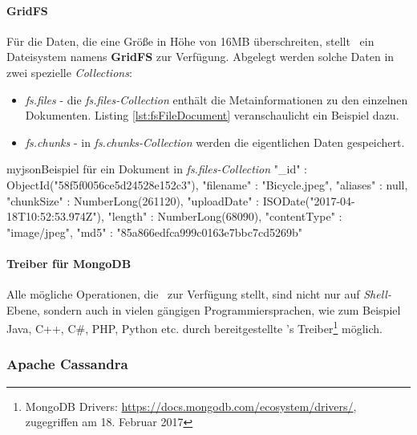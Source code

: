 \paragraph{GridFS}
Für die Daten, die eine Größe in Höhe von 16MB überschreiten, stellt \mongo\ ein Dateisystem namens \textbf{GridFS} zur Verfügung. Abgelegt werden solche Daten in zwei spezielle \textit{Collections}:

\begin{itemize}

\item \textit{fs.files} - die \textit{fs.files-Collection} enthält die Metainformationen zu den einzelnen Dokumenten. Listing \ref{lst:fsFileDocument} veranschaulicht ein Beispiel dazu.
\item \textit{fs.chunks} - in \textit{fs.chunks-Collection} werden die eigentlichen Daten gespeichert.

\end{itemize}

\begin{listingsboxJava}[label={lst:fsFileDocument}]{myjson}{Beispiel für ein Dokument in \textit{fs.files-Collection}}
{
	"_id" : ObjectId("58f5f0056ce5d24528e152c3"),
	"filename" : "Bicycle.jpeg",
	"aliases" : null,
	"chunkSize" : NumberLong(261120),
	"uploadDate" : ISODate("2017-04-18T10:52:53.974Z"),
	"length" : NumberLong(68090),
	"contentType" : "image/jpeg",
	"md5" : "85a866edfca999c0163e7bbc7cd5269b"
}
\end{listingsboxJava}

\paragraph{Treiber für MongoDB}
Alle mögliche Operationen, die \mongo\ zur Verfügung stellt, sind nicht nur auf \textit{Shell-}Ebene, sondern auch in vielen gängigen Programmiersprachen, wie zum Beispiel Java, C++, C\#, PHP, Python etc. durch bereitgestellte \mongo's Treiber\footnote{MongoDB Drivers: \url{https://docs.mongodb.com/ecosystem/drivers/}, zugegriffen am 18. Februar 2017} möglich.

\subsubsection{Apache Cassandra}

